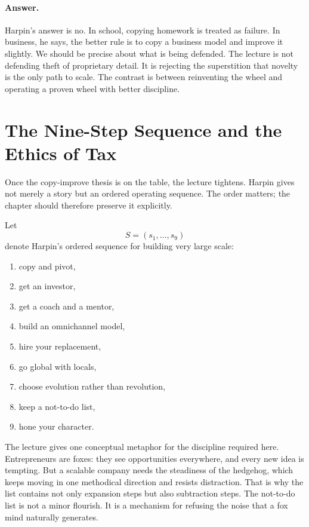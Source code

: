 \paragraph{Answer.} Harpin's answer is no. In school, copying homework is treated as failure. In business, he says, the better rule is to copy a business model and improve it slightly. We should be precise about what is being defended. The lecture is not defending theft of proprietary detail. It is rejecting the superstition that novelty is the only path to scale. The contrast is between reinventing the wheel and operating a proven wheel with better discipline.

\section{The Nine-Step Sequence and the Ethics of Tax}

Once the copy-improve thesis is on the table, the lecture tightens. Harpin gives not merely a story but an ordered operating sequence. The order matters; the chapter should therefore preserve it explicitly.

\begin{definition}
Let
\[
S=(s_1,\dots,s_9)
\]
denote Harpin's ordered sequence for building very large scale:
\begin{enumerate}
\item copy and pivot,
\item get an investor,
\item get a coach and a mentor,
\item build an omnichannel model,
\item hire your replacement,
\item go global with locals,
\item choose evolution rather than revolution,
\item keep a not-to-do list,
\item hone your character.
\end{enumerate}
\end{definition}

The lecture gives one conceptual metaphor for the discipline required here. Entrepreneurs are foxes: they see opportunities everywhere, and every new idea is tempting. But a scalable company needs the steadiness of the hedgehog, which keeps moving in one methodical direction and resists distraction. That is why the list contains not only expansion steps but also subtraction steps. The not-to-do list is not a minor flourish. It is a mechanism for refusing the noise that a fox mind naturally generates.

